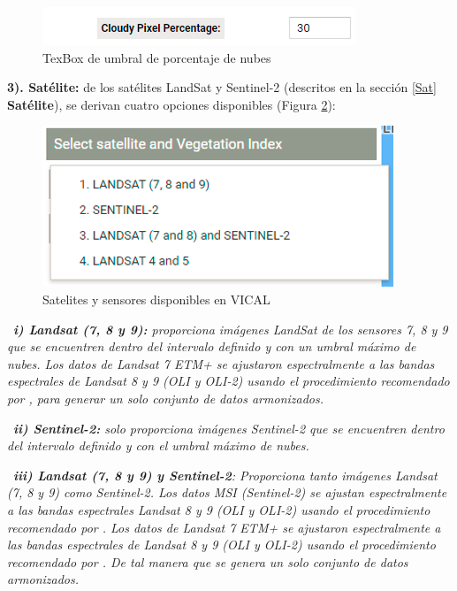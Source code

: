 \documentclass[
]{book}
\begin{document}
\begin{figure}

{\centering \includegraphics{./images/Figure2} 

}

\caption{TexBox de umbral de porcentaje de nubes}\label{fig:figG2}
\end{figure}

\textbf{3). Satélite: } de los satélites LandSat y Sentinel-2 (descritos en la sección \ref{Sat} \textbf{Satélite}), se derivan cuatro opciones disponibles (Figura \ref{fig:figG3}):

\begin{figure}

{\centering \includegraphics{./images/Figure3} 

}

\caption{Satelites y sensores disponibles en VICAL}\label{fig:figG3}
\end{figure}

~\emph{\textbf{i) Landsat (7, 8 y 9):} proporciona imágenes LandSat de los sensores 7, 8 y 9 que se encuentren dentro del intervalo definido y con un umbral máximo de nubes. Los datos de Landsat 7 ETM+ se ajustaron espectralmente a las bandas espectrales de Landsat 8 y 9 (OLI y OLI-2) usando el procedimiento recomendado por \citep{Roy2016}, para generar un solo conjunto de datos armonizados.}

~\emph{\textbf{ii) Sentinel-2:} solo proporciona imágenes Sentinel-2 que se encuentren dentro del intervalo definido y con el umbral máximo de nubes.}

~\emph{\textbf{iii) Landsat (7, 8 y 9) y Sentinel-2}: Proporciona tanto imágenes Landsat (7, 8 y 9) como Sentinel-2. Los datos MSI (Sentinel-2) se ajustan espectralmente a las bandas espectrales Landsat 8 y 9 (OLI y OLI-2) usando el procedimiento recomendado por \citep{Claverie2018}. Los datos de Landsat 7 ETM+ se ajustaron espectralmente a las bandas espectrales de Landsat 8 y 9 (OLI y OLI-2) usando el procedimiento recomendado por \citep{Roy2016}. De tal manera que se genera un solo conjunto de datos armonizados.}
\end{document}

